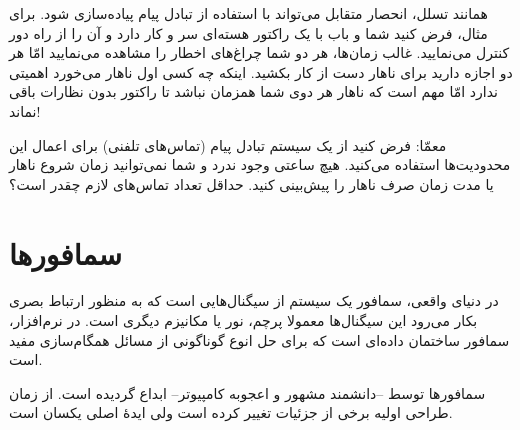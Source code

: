\documentclass{book}
\newcommand{\clearemptydoublepage}{\newpage\cleardoublepage}
\begin{document}
    همانند تسلل، انحصار متقابل می‌تواند با استفاده از تبادل پیام پیاده‌سازی شود. برای مثال، فرض کنید شما و باب 
    با یک راکتور هسته‌ای سر و کار دارد و آن را از راه دور کنترل می‌نمایید. غالب زمان‌ها، هر دو شما چراغ‌های اخطار را مشاهده می‌نمایید 
    امّا هر دو اجازه دارید برای ناهار  دست از کار بکشید. 
    اینکه چه کسی اول ناهار می‌خورد اهمیتی ندارد امّا مهم است که ناهار هر دوی شما همزمان نباشد تا راکتور بدون نظارات باقی نماند!

    معمّا: فرض کنید از یک سیستم تبادل پیام (تماس‌های تلفنی) برای اعمال این محدودیت‌ها استفاده می‌کنید. 
    هیچ ساعتی وجود ندرد و شما نمی‌توانید زمان شروع ناهار یا مدت زمان صرف ناهار را پیش‌بینی کنید. 
    حداقل تعداد تماس‌های لازم چقدر است؟
    
\clearemptydoublepage
\chapter{سمافورها}

    در دنیای واقعی، سمافور یک سیستم از سیگنال‌هایی است که به منظور ارتباط بصری بکار می‌رود این سیگنال‌ها معمولا پرچم،‌ نور یا مکانیزم دیگری است. 
    در نرم‌افزار، سمافور ساختمان داده‌ای است که برای حل انوع گوناگونی از مسائل همگام‌سازی مفید است.

    سمافورها توسط  --دانشمند مشهور و اعجوبه کامپیوتر-- ابداع گردیده است. 
    از زمان طراحی اولیه برخی از جزئیات تغییر کرده است ولی ایدهٔ اصلی یکسان است. 
\end{document}
